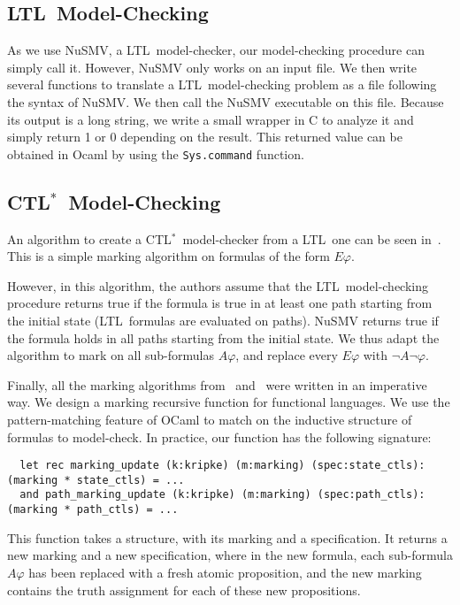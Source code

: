 \documentclass[dvipsnames]{acmart}
\def\ctls{CTL$^{*}$}
\def\ltl{LTL}
\def\A{\mathit{A}}
\def\E{\mathit{E}}
\begin{document}
\subsection{\ltl\ Model-Checking}
As we use NuSMV, a \ltl\ model-checker, our model-checking procedure can simply call it.
However, NuSMV only works on an input file. We then write several functions to translate a \ltl\ model-checking problem as a file following the syntax of NuSMV.
We then call the NuSMV executable on this file. Because its output is a long string, we write a small wrapper in C to analyze it and simply return 1 or 0 depending on the result. This returned value can be obtained in Ocaml by using the \lstinline{Sys.command} function.

\subsection{\ctls\ Model-Checking}
An algorithm to create a \ctls\ model-checker from a \ltl\ one can be seen in~\cite{reduction}.
This is a simple marking algorithm on formulas of the form $\E\varphi$.

However, in this algorithm, the authors assume that the \ltl\ model-checking procedure returns true if the formula is true in at least one path starting from the initial state (\ltl\ formulas are evaluated on paths).
NuSMV returns true if the formula holds in all paths starting from the initial state.
We thus adapt the algorithm to mark on all sub-formulas $\A\varphi$, and replace every $\E\varphi$ with $\neg\A\neg\varphi$.

Finally, all the marking algorithms from~\cite{reduction} and~\cite{internship} were written in an imperative way.
We design a marking recursive function for functional languages.
We use the pattern-matching feature of OCaml to match on the inductive structure of formulas to model-check.
In practice, our function has the following signature:

\begin{lstlisting}
  let rec marking_update (k:kripke) (m:marking) (spec:state_ctls): (marking * state_ctls) = ...
  and path_marking_update (k:kripke) (m:marking) (spec:path_ctls): (marking * path_ctls) = ...
\end{lstlisting}

This function takes a structure, with its marking and a specification. It returns a new marking and a new specification, where in the new formula, each sub-formula $\A\varphi$ has been replaced with a fresh atomic proposition, and the new marking contains the truth assignment for each of these new propositions.
\end{document}
